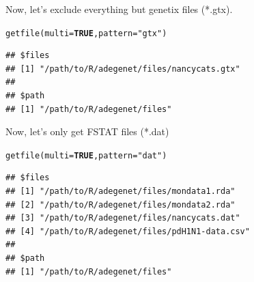 \documentclass[letterpaper]{article}\usepackage[]{graphicx}\usepackage[]{color}
\makeatletter
\newcommand{\hlnum}[1]{\textcolor[rgb]{0.502,0,0.502}{\textbf{#1}}}%
\newcommand{\hlstr}[1]{\textcolor[rgb]{0.651,0.522,0}{#1}}%
\newcommand{\hlstd}[1]{\textcolor[rgb]{0,0,0}{#1}}%
\newcommand{\hlkwc}[1]{\textcolor[rgb]{0,0.502,0.753}{#1}}%
\newcommand{\hlkwd}[1]{\textcolor[rgb]{0,0.267,0.4}{#1}}%
\newenvironment{kframe}{%
 \def\at@end@of@kframe{}%
 \ifinner\ifhmode%
  \def\at@end@of@kframe{\end{minipage}}%
  \begin{minipage}{\columnwidth}%
 \fi\fi%
 \def\FrameCommand##1{\hskip\@totalleftmargin \hskip-\fboxsep
 \colorbox{shadecolor}{##1}\hskip-\fboxsep
     \hskip-\linewidth \hskip-\@totalleftmargin \hskip\columnwidth}%
 \MakeFramed {\advance\hsize-\width
   \@totalleftmargin\z@ \linewidth\hsize
   \@setminipage}}%
 {\par\unskip\endMakeFramed%
 \at@end@of@kframe}
\newenvironment{knitrout}{}{} %
\makeatother
\begin{document}
Now, let's exclude everything but genetix files (*.gtx).
\begin{knitrout}\footnotesize
{}\color{fgcolor}\begin{kframe}
\begin{alltt}
\hlkwd{getfile}\hlstd{(}\hlkwc{multi} \hlstd{=} \hlnum{TRUE}\hlstd{,} \hlkwc{pattern} \hlstd{=} \hlstr{"gtx"}\hlstd{)}
\end{alltt}
\end{kframe}
\end{knitrout}

\begin{knitrout}\footnotesize
{}\color{fgcolor}\begin{kframe}
\begin{verbatim}
## $files
## [1] "/path/to/R/adegenet/files/nancycats.gtx"
## 
## $path
## [1] "/path/to/R/adegenet/files"
\end{verbatim}
\end{kframe}
\end{knitrout}

Now, let's only get FSTAT files (*.dat)
\begin{knitrout}\footnotesize
{}\color{fgcolor}\begin{kframe}
\begin{alltt}
\hlkwd{getfile}\hlstd{(}\hlkwc{multi} \hlstd{=} \hlnum{TRUE}\hlstd{,} \hlkwc{pattern} \hlstd{=} \hlstr{"dat"}\hlstd{)}
\end{alltt}
\end{kframe}
\end{knitrout}

\begin{knitrout}\footnotesize
{}\color{fgcolor}\begin{kframe}
\begin{verbatim}
## $files
## [1] "/path/to/R/adegenet/files/mondata1.rda"   
## [2] "/path/to/R/adegenet/files/mondata2.rda"   
## [3] "/path/to/R/adegenet/files/nancycats.dat"  
## [4] "/path/to/R/adegenet/files/pdH1N1-data.csv"
## 
## $path
## [1] "/path/to/R/adegenet/files"
\end{verbatim}
\end{kframe}
\end{knitrout}
\end{document}

